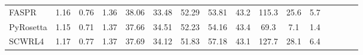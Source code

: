 \begin{table}
{\begin{tabular}{@{}lccccccccccccccc@{}}
                \textnormal{\hspace{0.5cm}FASPR} & 1.16 & 0.76 & 1.36 & 38.06 & 33.48 & 52.29 & 53.81 & 43.2 & 115.3 & 25.6 & 5.7 \\
                \textnormal{\hspace{0.5cm}PyRosetta} & 1.15 & 0.71 & 1.37 & 37.66 & 34.51 & 52.23 & 54.16 & 43.4 & 69.3 & 7.1 & 1.4 \\
                \textnormal{\hspace{0.5cm}SCWRL4} & 1.17 & 0.77 & 1.37 & 37.69 & 34.12 & 51.83 & 57.18 & 43.1 & 127.7 & 28.1 & 6.4 \\
            \bottomrule
        \end{tabular}
    }
    \label{tab:casp14_data_table}
\end{table}